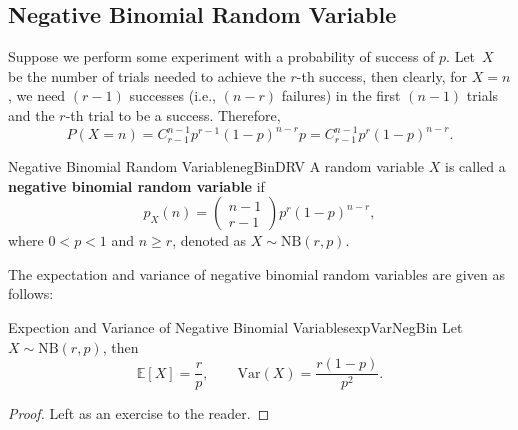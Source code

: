 \documentclass[math]{amznotes}
\theoremstyle{remark}
\newcommand{\0}{\mathbf{0}}
\newcommand{\1}{\mathbf{1}}
\begin{document}
\subsection{Negative Binomial Random Variable}
Suppose we perform some experiment with a probability of success of $p$. Let~$X$ be the number of trials needed to achieve the $r$-th success, then clearly, for $X = n$, we need $(r - 1)$ successes (i.e., $(n - r)$ failures) in the first $(n - 1)$ trials and the $r$-th trial to be a success. Therefore,
\begin{equation*}
    P(X = n) = C^{n - 1}_{r - 1}p^{r - 1}(1 - p)^{n - r}p = C^{n - 1}_{r - 1}p^r(1 - p)^{n - r}.
\end{equation*}
\begin{dfnbox}{Negative Binomial Random Variable}{negBinDRV}
    A random variable $X$ is called a {\color{red} \textbf{negative binomial random variable}} if
    \begin{equation*}
        p_X(n) = \begin{pmatrix}
            n - 1 \\
            r - 1
        \end{pmatrix}p^r(1 - p)^{n - r},
    \end{equation*}
    where $0 < p < 1$ and $n \geq r$, denoted as $X \sim \mathrm{NB}(r, p)$.
\end{dfnbox}
The expectation and variance of negative binomial random variables are given as follows:
\begin{thmbox}{Expection and Variance of Negative Binomial Variables}{expVarNegBin}
    Let $X \sim \mathrm{NB}(r, p)$, then
    \begin{equation*}
        \mathbb{E}[X] = \frac{r}{p}, \qquad \mathrm{Var}(X) = \frac{r(1 - p)}{p^2}.
    \end{equation*}
    \tcblower
    \begin{proof}
        Left as an exercise to the reader.
    \end{proof}
\end{thmbox}
\end{document}
